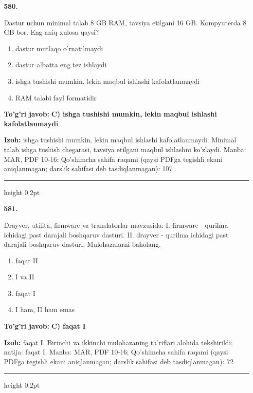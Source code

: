 \documentclass[10pt,a4paper]{article}
\begin{document}
{\bfseries\sffamily\color{ink} 580.}
\par
Dastur uchun minimal talab 8 GB RAM, tavsiya etilgani 16 GB. Kompyuterda 8 GB bor. Eng aniq xulosa qaysi?
\begin{enumerate}[label=\Alph*),leftmargin=9mm]
\item dastur mutlaqo o'rnatilmaydi
\item dastur albatta eng tez ishlaydi
\item ishga tushishi mumkin, lekin maqbul ishlashi kafolatlanmaydi
\item RAM talabi fayl formatidir
\end{enumerate}
\begin{tcolorbox}[enhanced,breakable,colback=teal!4,colframe=teal!60!black,boxrule=0.45pt,arc=1.2mm,left=2.7mm,right=2.7mm,top=1.8mm,bottom=1.8mm,before skip=2mm,after skip=2mm]
{\bfseries\sffamily\color{teal}To'g'ri javob:} \textbf{C) ishga tushishi mumkin, lekin maqbul ishlashi kafolatlanmaydi}
\par\smallskip
{\bfseries Izoh:} ishga tushishi mumkin, lekin maqbul ishlashi kafolatlanmaydi. Minimal talab ishga tushish chegarasi, tavsiya etilgani maqbul ishlashni ko'zlaydi. Manba: MAR, PDF 10-16; Qo'shimcha sahifa raqami (qaysi PDFga tegishli ekani aniqlanmagan; darslik sahifasi deb tasdiqlanmagan): 107
\end{tcolorbox}
\vspace{2mm}\hrule height 0.2pt\vspace{3mm}

{\bfseries\sffamily\color{ink} 581.}
\par
Drayver, utilita, firmware va translatorlar mavzusida: I. firmware - qurilma ichidagi past darajali boshqaruv dasturi. II. drayver - qurilma ichidagi past darajali boshqaruv dasturi. Mulohazalarni baholang.
\begin{enumerate}[label=\Alph*),leftmargin=9mm]
\item faqat II
\item I va II
\item faqat I
\item I ham, II ham emas
\end{enumerate}
\begin{tcolorbox}[enhanced,breakable,colback=teal!4,colframe=teal!60!black,boxrule=0.45pt,arc=1.2mm,left=2.7mm,right=2.7mm,top=1.8mm,bottom=1.8mm,before skip=2mm,after skip=2mm]
{\bfseries\sffamily\color{teal}To'g'ri javob:} \textbf{C) faqat I}
\par\smallskip
{\bfseries Izoh:} faqat I. Birinchi va ikkinchi mulohazaning ta'riflari alohida tekshirildi; natija: faqat I. Manba: MAR, PDF 10-16; Qo'shimcha sahifa raqami (qaysi PDFga tegishli ekani aniqlanmagan; darslik sahifasi deb tasdiqlanmagan): 72
\end{tcolorbox}
\vspace{2mm}\hrule height 0.2pt\vspace{3mm}
\end{document}
